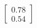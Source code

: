 \documentclass[preview]{standalone}
\begin{document}
\begin{align*}
\begin{bmatrix} 0.78 \\ 0.54 \end{bmatrix}
\end{align*}
\end{document}
